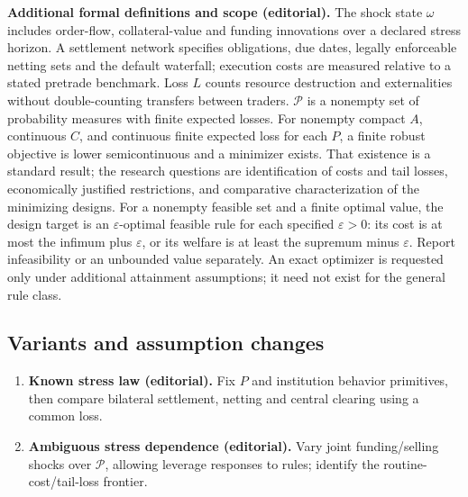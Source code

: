 \documentclass[11pt,a4paper]{article}
\begin{document}
\textbf{Additional formal definitions and scope (editorial).} The shock state \(\omega\) includes order-flow, collateral-value and funding innovations over a declared stress horizon. A settlement network specifies obligations, due dates, legally enforceable netting sets and the default waterfall; execution costs are measured relative to a stated pretrade benchmark. Loss \(L\) counts resource destruction and externalities without double-counting transfers between traders. \(\mathcal P\) is a nonempty set of probability measures with finite expected losses. For nonempty compact \(A\), continuous \(C\), and continuous finite expected loss for each \(P\), a finite robust objective is lower semicontinuous and a minimizer exists. That existence is a standard result; the research questions are identification of costs and tail losses, economically justified restrictions, and comparative characterization of the minimizing designs. For a nonempty feasible set and a finite optimal value, the design target is an \(\varepsilon\)-optimal feasible rule for each specified \(\varepsilon>0\): its cost is at most the infimum plus \(\varepsilon\), or its welfare is at least the supremum minus \(\varepsilon\). Report infeasibility or an unbounded value separately. An exact optimizer is requested only under additional attainment assumptions; it need not exist for the general rule class.
\subsection*{Variants and assumption changes}
\begin{enumerate}
\item \textbf{Known stress law (editorial).} Fix \(P\) and institution behavior primitives, then compare bilateral settlement, netting and central clearing using a common loss.
\item \textbf{Ambiguous stress dependence (editorial).} Vary joint funding/selling shocks over \(\mathcal P\), allowing leverage responses to rules; identify the routine-cost/tail-loss frontier.
\end{enumerate}
\end{document}
